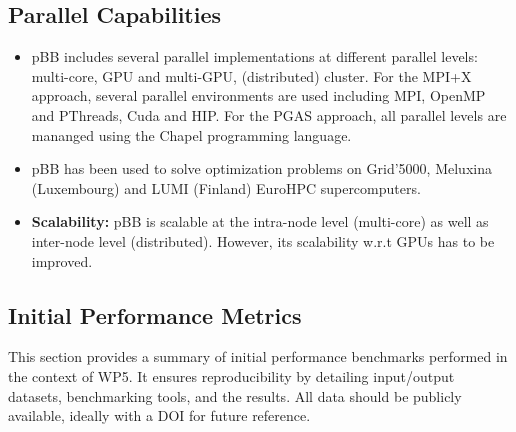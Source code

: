 \subsection{Parallel Capabilities}
\label{sec:WP5:pBB:performances}

\begin{itemize}
    \item pBB includes several parallel implementations at different parallel levels: multi-core, GPU and multi-GPU, (distributed) cluster. For the MPI+X approach, several parallel environments are used including MPI, OpenMP and PThreads, Cuda and HIP. For the PGAS approach, all parallel levels are mananged using the Chapel programming language.
    \item pBB has been used to solve optimization problems on Grid'5000, Meluxina (Luxembourg) and LUMI (Finland) EuroHPC supercomputers.
    \item \textbf{Scalability:} pBB is scalable at the intra-node level (multi-core) as well as inter-node level (distributed). However, its scalability w.r.t GPUs has to be improved.
\end{itemize}

\subsection{Initial Performance Metrics}
\label{sec:WP5:pBB:metrics}

This section provides a summary of initial performance benchmarks performed in the context of WP5. It ensures reproducibility by detailing input/output datasets, benchmarking tools, and the results. All data should be publicly available, ideally with a DOI for future reference.

